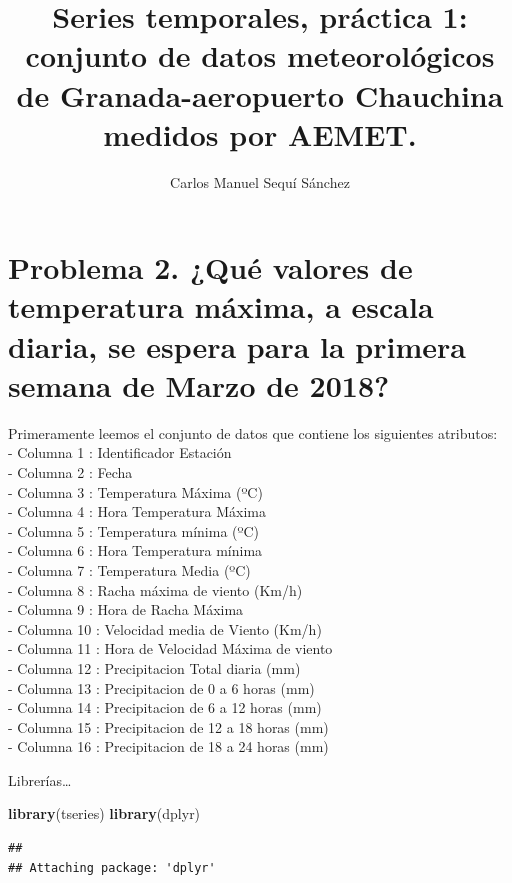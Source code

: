 \documentclass[]{article}
\title{Series temporales, práctica 1: conjunto de datos meteorológicos de
Granada-aeropuerto Chauchina medidos por AEMET.}
\author{Carlos Manuel Sequí Sánchez}
\date{}
\newenvironment{Shaded}{\begin{snugshade}}{\end{snugshade}}
\newcommand{\KeywordTok}[1]{\textcolor[rgb]{0.13,0.29,0.53}{\textbf{#1}}}
\newcommand{\NormalTok}[1]{#1}
\begin{document}
\maketitle

\section{Problema 2.  ¿Qué valores de temperatura máxima, a escala diaria, se espera para la primera semana de Marzo de 2018?}

Primeramente leemos el conjunto de datos que contiene los siguientes
atributos:\\
- Columna 1 : Identificador Estación\\
- Columna 2 : Fecha\\
- Columna 3 : Temperatura Máxima (ºC)\\
- Columna 4 : Hora Temperatura Máxima\\
- Columna 5 : Temperatura mínima (ºC)\\
- Columna 6 : Hora Temperatura mínima\\
- Columna 7 : Temperatura Media (ºC)\\
- Columna 8 : Racha máxima de viento (Km/h)\\
- Columna 9 : Hora de Racha Máxima\\
- Columna 10 : Velocidad media de Viento (Km/h)\\
- Columna 11 : Hora de Velocidad Máxima de viento\\
- Columna 12 : Precipitacion Total diaria (mm)\\
- Columna 13 : Precipitacion de 0 a 6 horas (mm)\\
- Columna 14 : Precipitacion de 6 a 12 horas (mm)\\
- Columna 15 : Precipitacion de 12 a 18 horas (mm)\\
- Columna 16 : Precipitacion de 18 a 24 horas (mm)

Librerías\ldots{}

\begin{Shaded}
\begin{Highlighting}[]
\KeywordTok{library}\NormalTok{(tseries)}
\KeywordTok{library}\NormalTok{(dplyr)}
\end{Highlighting}
\end{Shaded}

\begin{verbatim}
## 
## Attaching package: 'dplyr'
\end{verbatim}
\end{document}

